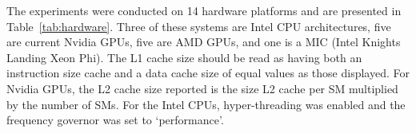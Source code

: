 \documentclass[../document.tex]{subfiles}
\begin{document}
The experiments were conducted on 14 hardware platforms and are presented in Table~\ref{tab:hardware}.
Three of these systems are Intel CPU architectures, five are current Nvidia GPUs, five are AMD GPUs, and one is a MIC (Intel Knights Landing Xeon Phi).
The L1 cache size should be read as having both an instruction size cache and a data cache size of equal values as those displayed. 
For Nvidia GPUs, the L2 cache size reported is the size L2 cache per SM multiplied by the number of SMs.
For the Intel CPUs, hyper-threading was enabled and the frequency governor was set to `performance'.
\end{document}
